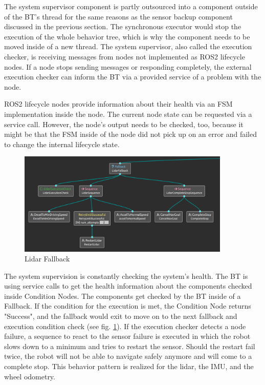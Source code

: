 The system supervisor component is partly outsourced into a component outside of the BT's thread for the same reasons as the sensor backup component discussed in the previous section. The synchronous executor would stop the execution of the whole behavior tree, which is why the component needs to be moved inside of a new thread. The system supervisor, also called the execution checker, is receiving messages from nodes not implemented as ROS2 lifecycle nodes. If a node stops sending messages or responding completely, the external execution checker can inform the BT via a provided service of a problem with the node. 

ROS2 lifecycle nodes provide information about their health via an FSM implementation inside the node. The current node state can be requested via a service call. However, the node's output needs to be checked, too, because it might be that the FSM inside of the node did not pick up on an error and failed to change the internal lifecycle state. 

\begin{figure}[ht]
	\centering
	\includegraphics[width=0.9\textwidth]{images/sensor_fallback.png}
	\caption{Lidar Fallback}
	\label{fig:lidar_fallback}
\end{figure}

The system supervision is constantly checking the system's health. The BT is using service calls to get the health information about the components checked inside Condition Nodes. The components get checked by the BT inside of a Fallback. If the condition for the execution is met, the Condition Node returns "Success", and the fallback would exit to move on to the next fallback and execution condition check (see fig. \ref{fig:lidar_fallback}). If the execution checker detects a node failure, a sequence to react to the sensor failure is executed in which the robot slows down to a minimum and tries to restart the sensor. Should the restart fail twice, the robot will not be able to navigate safely anymore and will come to a complete stop. This behavior pattern is realized for the lidar, the IMU, and the wheel odometry. 

